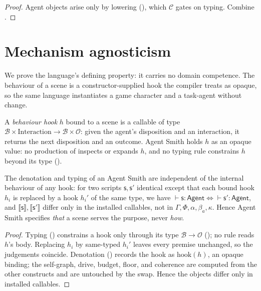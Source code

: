 \documentclass[11pt,twocolumn,a4paper]{article}
\newcommand{\Self}{\Gamma}
\newcommand{\floorc}{\beta}
\newcommand{\drive}{\Phi}
\newcommand{\att}{\alpha}
\newcommand{\Out}{\mathcal{O}}
\newcommand{\spec}{\mathsf{s}}         %
\newcommand{\compile}{\mathcal{C}}     %
\newcommand{\coh}{\kappa}              %
\newcommand{\judge}{\vdash}
\begin{document}
\begin{proof}
Agent objects arise only by lowering (), which $\compile$
gates on typing. Combine .
\end{proof}

\section{Mechanism agnosticism}
\label{sec:agnostic}

We prove the language's defining property: it carries no domain competence.
The behaviour of a scene is a constructor-supplied hook the compiler treats as
opaque, so the same language instantiates a game character and a task-agent
without change.

\begin{definition}
\label{def:hook}
A \emph{behaviour hook} $h$ bound to a scene is a callable of type
$\mathcal{B}\times\text{Interaction}\to\mathcal{B}\times\Out$: given the
agent's disposition and an interaction, it returns the next disposition and an
outcome. Agent Smith holds $h$ as an opaque value: no production of
 inspects or expands $h$, and no typing rule constrains $h$
beyond its type ().
\end{definition}

\begin{theorem}
\label{thm:agnostic}
The denotation and typing of an Agent Smith are independent of the internal
behaviour of any hook: for two scripts $\spec,\spec'$ identical except that
each bound hook $h_i$ is replaced by a hook $h_i'$ of the same type, we have
$\judge\spec:\mathsf{Agent}\iff\judge\spec':\mathsf{Agent}$, and
$\llbracket\spec\rrbracket,\llbracket\spec'\rrbracket$ differ only in the
installed callables, not in $\Self,\drive,\att,\floorc_a,\coh$. Hence Agent
Smith specifies \emph{that} a scene serves the purpose, never \emph{how}.
\end{theorem}

\begin{proof}
Typing () constrains a hook
only through its type $\mathcal{B}\to\Out$ (); no rule reads
$h$'s body. Replacing $h_i$ by same-typed $h_i'$ leaves every premise
unchanged, so the judgements coincide. Denotation ()
records the hook as $\mathrm{hook}(h)$, an opaque binding; the self-graph,
drive, budget, floor, and coherence are computed from the other constructs and
are untouched by the swap. Hence the objects differ only in installed
callables.
\end{proof}
\end{document}
